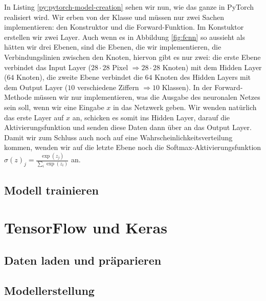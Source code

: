 

In Listing \ref{py:pytorch-model-creation} sehen wir nun, wie das ganze in PyTorch realisiert wird. 
Wir erben von der Klasse  und müssen nur zwei Sachen implementieren: 
den Konstruktor und die Forward-Funktion.
Im Konstuktor erstellen wir zwei Layer. Auch wenn es in Abbildung \ref{fig:fcnn} 
so aussieht als hätten wir drei Ebenen, sind die Ebenen, die wir implementieren, 
die Verbindungslinien zwischen den Knoten, hiervon gibt es nur zwei: 
die erste Ebene verbindet das Input Layer (\(28 \cdot 28\) Pixel \(\Rightarrow 28 \cdot 28\) Knoten) 
mit dem Hidden Layer (\(64\) Knoten), die zweite Ebene verbindet die \(64\) Knoten des Hidden Layers
mit dem Output Layer (\(10\) verschiedene Ziffern \(\Rightarrow 10\) Klassen).
In der Forward-Methode müssen wir nur implementieren, was die Ausgabe des 
neuronalen Netzes sein soll, wenn wir eine Eingabe \(x\) in das Netzwerk geben. 
Wir wenden natürlich das erste Layer auf \(x\) an, schicken es somit ins Hidden Layer, 
darauf die Aktivierungsfunktion und senden diese Daten dann über  an das Output Layer.
Damit wir zum Schluss auch noch auf eine Wahrscheinlichkeitsverteilung kommen, 
wenden wir auf die letzte Ebene noch die Softmax-Aktivierungsfunktion \(\sigma(z)_j = \frac{\exp(z_j)}{\sum_{i} \exp(z_i)}\) an.

\subsection{Modell trainieren}



\section{TensorFlow und Keras}
\subsection{Daten laden und präparieren}



\subsection{Modellerstellung}

